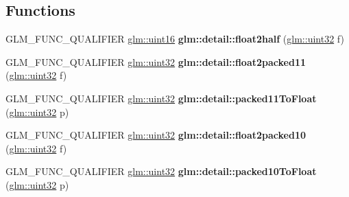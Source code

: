 \subsection*{Functions}
\begin{DoxyCompactItemize}
\item 
\mbox{\label{packing_8inl_a35cfc58b7112bdadd2610cf9f1780255}} 
G\+L\+M\+\_\+\+F\+U\+N\+C\+\_\+\+Q\+U\+A\+L\+I\+F\+I\+ER \hyperlink{group__gtc__type__precision_gad8c2939e1fdd8e5828b31d95c52255d5}{glm\+::uint16} {\bfseries glm\+::detail\+::float2half} (\hyperlink{group__gtc__type__precision_ga202b6a53c105fcb7e531f9b443518451}{glm\+::uint32} f)
\item 
\mbox{\label{packing_8inl_af3fe5d54f7627eb98c3493ee0a4b6fba}} 
G\+L\+M\+\_\+\+F\+U\+N\+C\+\_\+\+Q\+U\+A\+L\+I\+F\+I\+ER \hyperlink{group__gtc__type__precision_ga202b6a53c105fcb7e531f9b443518451}{glm\+::uint32} {\bfseries glm\+::detail\+::float2packed11} (\hyperlink{group__gtc__type__precision_ga202b6a53c105fcb7e531f9b443518451}{glm\+::uint32} f)
\item 
\mbox{\label{packing_8inl_a02d2bd65041cc9eb287030ae553051f0}} 
G\+L\+M\+\_\+\+F\+U\+N\+C\+\_\+\+Q\+U\+A\+L\+I\+F\+I\+ER \hyperlink{group__gtc__type__precision_ga202b6a53c105fcb7e531f9b443518451}{glm\+::uint32} {\bfseries glm\+::detail\+::packed11\+To\+Float} (\hyperlink{group__gtc__type__precision_ga202b6a53c105fcb7e531f9b443518451}{glm\+::uint32} p)
\item 
\mbox{\label{packing_8inl_a066e984b6ff1a54325e8d11afed5a0f9}} 
G\+L\+M\+\_\+\+F\+U\+N\+C\+\_\+\+Q\+U\+A\+L\+I\+F\+I\+ER \hyperlink{group__gtc__type__precision_ga202b6a53c105fcb7e531f9b443518451}{glm\+::uint32} {\bfseries glm\+::detail\+::float2packed10} (\hyperlink{group__gtc__type__precision_ga202b6a53c105fcb7e531f9b443518451}{glm\+::uint32} f)
\item 
\mbox{\label{packing_8inl_a4b6b6f9fdf91cf039dfb119f94686f8a}} 
G\+L\+M\+\_\+\+F\+U\+N\+C\+\_\+\+Q\+U\+A\+L\+I\+F\+I\+ER \hyperlink{group__gtc__type__precision_ga202b6a53c105fcb7e531f9b443518451}{glm\+::uint32} {\bfseries glm\+::detail\+::packed10\+To\+Float} (\hyperlink{group__gtc__type__precision_ga202b6a53c105fcb7e531f9b443518451}{glm\+::uint32} p)
\item 
\mbox{\label{packing_8inl_a69b64ab4be52c9601b31588c8c813ca0}} 

\end{DoxyCompactItemize}
